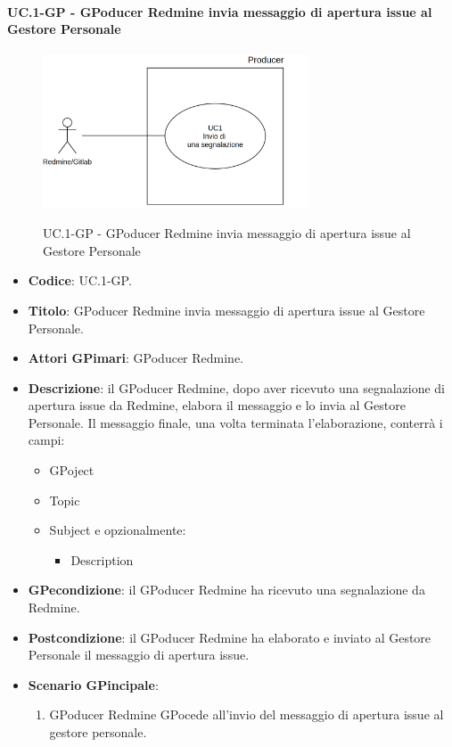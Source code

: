 		\paragraph{UC\theuccount.1-GP - GPoducer Redmine invia messaggio di apertura issue al Gestore Personale}
	\begin{figure}[H]
		\centering
		\includegraphics[width=0.7\textwidth]{img/UC1.png}\\
		\caption{UC\theuccount.1-GP - GPoducer Redmine invia messaggio di apertura issue al Gestore Personale}
	\end{figure}
	\begin{itemize}
		\item \textbf{Codice}: UC\theuccount.1-GP.
		\item \textbf{Titolo}: GPoducer Redmine invia messaggio di apertura issue al Gestore Personale.
		\item \textbf{Attori GPimari}: GPoducer Redmine.
		\item \textbf{Descrizione}: il GPoducer Redmine, dopo aver
		ricevuto una segnalazione di apertura issue da Redmine, elabora
		il messaggio e lo invia al Gestore Personale.
		Il messaggio finale, una volta terminata l'elaborazione, conterrà i campi:
		\begin{itemize}
			\item GPoject
			\item Topic
			\item Subject e opzionalmente:
			\begin{itemize}
				\item Description
			\end{itemize}
		\end{itemize}
		\item \textbf{GPecondizione}: il GPoducer Redmine ha ricevuto una segnalazione da Redmine.
		\item \textbf{Postcondizione}: il GPoducer Redmine ha elaborato e inviato al Gestore Personale il messaggio di apertura issue.
		\item \textbf{Scenario GPincipale}: 
		\begin{enumerate}
			\item GPoducer Redmine GPocede all'invio del messaggio di
			apertura issue al gestore personale.
		\end{enumerate}
		
	\end{itemize}
	
